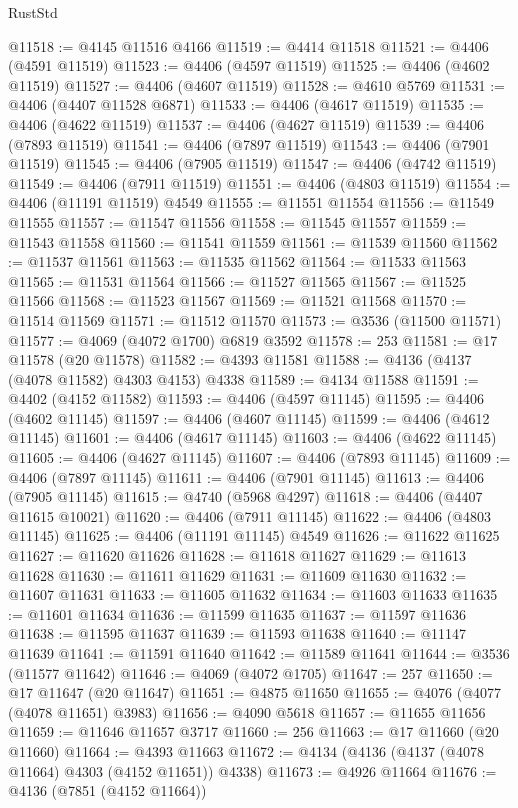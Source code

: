 \begin{lexlean}{RustStd}
\begin{coremodule}
@11518 := @4145 @11516 @4166
@11519 := @4414 @11518
@11521 := @4406 (@4591 @11519)
@11523 := @4406 (@4597 @11519)
@11525 := @4406 (@4602 @11519)
@11527 := @4406 (@4607 @11519)
@11528 := @4610 @5769
@11531 := @4406 (@4407 @11528 @6871)
@11533 := @4406 (@4617 @11519)
@11535 := @4406 (@4622 @11519)
@11537 := @4406 (@4627 @11519)
@11539 := @4406 (@7893 @11519)
@11541 := @4406 (@7897 @11519)
@11543 := @4406 (@7901 @11519)
@11545 := @4406 (@7905 @11519)
@11547 := @4406 (@4742 @11519)
@11549 := @4406 (@7911 @11519)
@11551 := @4406 (@4803 @11519)
@11554 := @4406 (@11191 @11519) @4549
@11555 := @11551 @11554
@11556 := @11549 @11555
@11557 := @11547 @11556
@11558 := @11545 @11557
@11559 := @11543 @11558
@11560 := @11541 @11559
@11561 := @11539 @11560
@11562 := @11537 @11561
@11563 := @11535 @11562
@11564 := @11533 @11563
@11565 := @11531 @11564
@11566 := @11527 @11565
@11567 := @11525 @11566
@11568 := @11523 @11567
@11569 := @11521 @11568
@11570 := @11514 @11569
@11571 := @11512 @11570
@11573 := @3536 (@11500 @11571)
@11577 := @4069 (@4072 @1700) @6819 @3592
@11578 := 253
@11581 := @17 @11578 (@20 @11578)
@11582 := @4393 @11581
@11588 := @4136 (@4137 (@4078 @11582) @4303 @4153) @4338
@11589 := @4134 @11588
@11591 := @4402 (@4152 @11582)
@11593 := @4406 (@4597 @11145)
@11595 := @4406 (@4602 @11145)
@11597 := @4406 (@4607 @11145)
@11599 := @4406 (@4612 @11145)
@11601 := @4406 (@4617 @11145)
@11603 := @4406 (@4622 @11145)
@11605 := @4406 (@4627 @11145)
@11607 := @4406 (@7893 @11145)
@11609 := @4406 (@7897 @11145)
@11611 := @4406 (@7901 @11145)
@11613 := @4406 (@7905 @11145)
@11615 := @4740 (@5968 @4297)
@11618 := @4406 (@4407 @11615 @10021)
@11620 := @4406 (@7911 @11145)
@11622 := @4406 (@4803 @11145)
@11625 := @4406 (@11191 @11145) @4549
@11626 := @11622 @11625
@11627 := @11620 @11626
@11628 := @11618 @11627
@11629 := @11613 @11628
@11630 := @11611 @11629
@11631 := @11609 @11630
@11632 := @11607 @11631
@11633 := @11605 @11632
@11634 := @11603 @11633
@11635 := @11601 @11634
@11636 := @11599 @11635
@11637 := @11597 @11636
@11638 := @11595 @11637
@11639 := @11593 @11638
@11640 := @11147 @11639
@11641 := @11591 @11640
@11642 := @11589 @11641
@11644 := @3536 (@11577 @11642)
@11646 := @4069 (@4072 @1705)
@11647 := 257
@11650 := @17 @11647 (@20 @11647)
@11651 := @4875 @11650
@11655 := @4076 (@4077 (@4078 @11651) @3983)
@11656 := @4090 @5618
@11657 := @11655 @11656
@11659 := @11646 @11657 @3717
@11660 := 256
@11663 := @17 @11660 (@20 @11660)
@11664 := @4393 @11663
@11672 := @4134 (@4136 (@4137 (@4078 @11664) @4303 (@4152 @11651)) @4338)
@11673 := @4926 @11664
@11676 := @4136 (@7851 (@4152 @11664))

\end{coremodule}
\end{lexlean}
